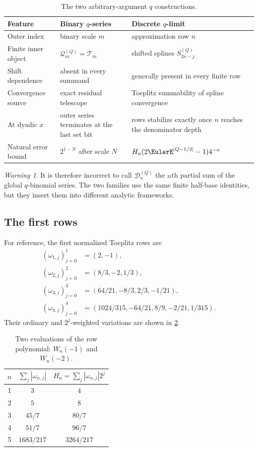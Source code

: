\documentclass[11pt,oneside]{article}
\theoremstyle{definition}
\theoremstyle{remark}
\newtheorem{warning}[warning]{Warning}
\begin{document}
\begin{table}[ht]
\centering
\small
\begin{tabularx}{\textwidth}{@{}p{}XX@{}}
\toprule
Feature & Binary $q$-series & Discrete $q$-limit \\
\midrule
Outer index & binary scale $m$ & approximation row $n$ \\
Finite inner object & $\mathcal Q_m^{(Q)}=\mathcal T_m$ & shifted splines $S_{2n-j}^{(Q)}$ \\
Shift dependence & absent in every summand & generally present in every finite row \\
Convergence source & exact residual telescope & Toeplitz summability of spline convergence \\
At dyadic $x$ & outer series terminates at the last set bit & rows stabilize exactly once $n$ reaches the denominator depth \\
Natural error bound & $2^{1-N}$ after scale $N$ & $H_n(2\EulerE^{|Q-1/2|}-1)4^{-n}$ \\
\bottomrule
\end{tabularx}
\caption{The two arbitrary-argument $q$ constructions.}
\label{dyadicweb:tab:two-infinite}
\end{table}

\begin{warning}
It is therefore incorrect to call $\mathcal D_n^{(Q)}$ the $n$th partial sum of the global
$q$-binomial series.  The two families use the same finite half-base identities, but they
insert them into different analytic frameworks.
\end{warning}

\subsection{The first rows}

For reference, the first normalized Toeplitz rows are
\begin{align*}
 (\omega_{1,j})_{j=0}^{1}&=(2,-1),\\
 (\omega_{2,j})_{j=0}^{2}&=(8/3,-2,1/3),\\
 (\omega_{3,j})_{j=0}^{3}&=(64/21,-8/3,2/3,-1/21),\\
 (\omega_{4,j})_{j=0}^{4}&=(1024/315,-64/21,8/9,-2/21,1/315).
\end{align*}
Their ordinary and $2^j$-weighted variations are shown in
\cref{dyadicweb:tab:row-constants}.

\begin{table}[ht]
\centering
\small
\begin{tabular}{@{}c c c@{}}
\toprule
$n$ & $\sum_j|\omega_{n,j}|$ & $H_n=\sum_j|\omega_{n,j}|2^j$ \\
\midrule
1 & $3$ & $4$ \\
2 & $5$ & $8$ \\
3 & $45/7$ & $80/7$ \\
4 & $51/7$ & $96/7$ \\
5 & $1683/217$ & $3264/217$ \\
\bottomrule
\end{tabular}
\caption{Two evaluations of the row polynomial: $W_n(-1)$ and $W_n(-2)$.}
\label{dyadicweb:tab:row-constants}
\end{table}
\end{document}
